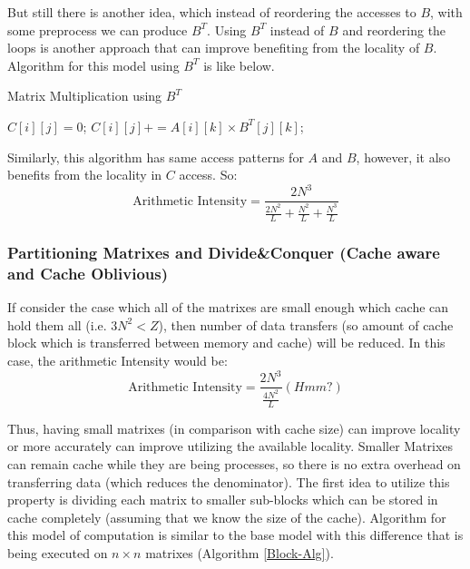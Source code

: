 \documentclass[paper=a4, fontsize=11pt]{scrartcl} %
\numberwithin{equation}{section} %
\numberwithin{figure}{section} %
\numberwithin{table}{section} %
\begin{document}
But still there is another idea, which instead of reordering the accesses to $B$, with some preprocess we can produce $B^{T}$. Using $B^{T}$ instead of $B$ and reordering the loops is another approach that can improve benefiting from the locality of $B$. Algorithm for this model using $B^{T}$ is like below.\\

\begin{algorithm}
\caption{Matrix Multiplication using $B^{T}$}
\label{Transpose-Alg}
\begin{algorithmic}
		\State $C[ i ][ j ] = 0$;
		\State $C[ i ][ j ] += A[ i ][ k ] \times B^{T}[ j ][ k ]$; 
		\EndFor
	\EndFor
\EndFor
\end{algorithmic}
\end{algorithm}

Similarly, this algorithm has same access patterns for $A$ and $B$, however, it also benefits from the locality in $C$ access. So:
\begin{equation*}
\text{Arithmetic Intensity} = \frac{2N^{3}}{ \frac{2N^{2}}{L} + \frac{N^{2}}{L} + \frac{N^{3}}{L} }
\end{equation*}

\newpage
\subsubsection{Partitioning Matrixes and Divide\&Conquer (Cache aware and Cache Oblivious)  }
If consider the case which all of the matrixes are small enough which cache can hold them all (i.e. $3N^{2} < Z$), then number of data transfers (so amount of cache block which is transferred between memory and cache) will be reduced. In this case, the arithmetic Intensity would be:
\begin{equation*}
\text{Arithmetic Intensity} = \frac{2N^{3}}{\frac{4N^{2}}{L}} (Hmm?)
\end{equation*}

Thus, having small matrixes (in comparison with cache size) can improve locality or more accurately can improve utilizing the available locality. Smaller Matrixes can remain cache while they are being processes, so there is no extra overhead on transferring data (which reduces the denominator). The first idea to utilize this property is dividing each matrix to smaller sub-blocks which can be stored in cache completely (assuming that we know the size of the cache). Algorithm for this model of computation is similar to the base model with this difference that is being executed on $n \times n$ matrixes (Algorithm \ref{Block-Alg}).\\
\end{document}
